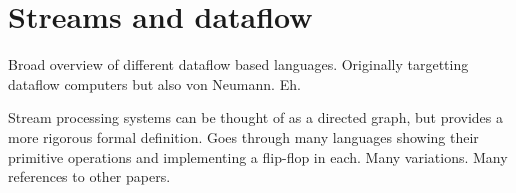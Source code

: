 \section{Streams and dataflow}

Broad overview of different dataflow based languages.
Originally targetting dataflow computers but also von Neumann. Eh.


Stream processing systems can be thought of as a directed graph,
but provides a more rigorous formal definition.
Goes through many languages showing their primitive operations and
implementing a flip-flop in each. 
Many variations. Many references to other papers.
